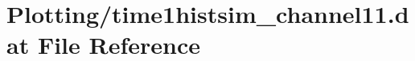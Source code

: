 \hypertarget{Plotting_2time1histsim__channel11_8dat}{}\section{Plotting/time1histsim\+\_\+channel11.dat File Reference}
\label{Plotting_2time1histsim__channel11_8dat}
